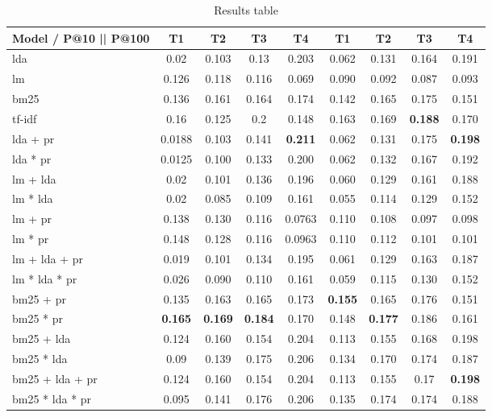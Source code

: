 \begin{table*}[h]
	\centering
	\caption{Results table}
	\begin{tabular}{l|c|c|c|c||c|c|c|c}
		Model / P@10 || P@100 & T1 & T2 & T3 & T4 & T1 & T2 & T3 & T4\\
		\midrule
		\gls{lda} & 0.02 & 0.103 & 0.13 & 0.203 & 0.062 & 0.131 & 0.164 & 0.191 \\
		\gls{lm} & 0.126 & 0.118 & 0.116 & 0.069 & 0.090 & 0.092 & 0.087 & 0.093\\
		\gls{bm25} & 0.136 & 0.161 & 0.164 & 0.174 & 0.142 & 0.165 & 0.175 & 0.151\\ 
		\gls{tf-idf} & 0.16 & 0.125 & 0.2 & 0.148 & 0.163 & 0.169 & \textbf{0.188} & 0.170 \\
		\gls{lda} + \gls{pr} & 0.0188 & 0.103 & 0.141 & \textbf{0.211} & 0.062 & 0.131 & 0.175 & \textbf{0.198} \\
		\gls{lda} * \gls{pr} & 0.0125 & 0.100 & 0.133 & 0.200 & 0.062 & 0.132 & 0.167 & 0.192 \\
		\gls{lm} + \gls{lda} & 0.02 & 0.101 & 0.136 & 0.196 & 0.060 & 0.129 & 0.161 & 0.188  \\
		\gls{lm} * \gls{lda} & 0.02 & 0.085 & 0.109 & 0.161 & 0.055 & 0.114 & 0.129 & 0.152 \\
		\gls{lm} + \gls{pr} & 0.138 & 0.130 & 0.116 & 0.0763 & 0.110 & 0.108 & 0.097 & 0.098 \\
		\gls{lm} * \gls{pr} & 0.148 & 0.128 & 0.116 & 0.0963 & 0.110 & 0.112 & 0.101 & 0.101 \\
		\gls{lm} + \gls{lda} + \gls{pr} & 0.019 & 0.101 & 0.134 & 0.195 & 0.061 & 0.129 & 0.163 & 0.187\\
		\gls{lm} * \gls{lda} * \gls{pr} & 0.026 & 0.090 & 0.110 & 0.161 & 0.059 & 0.115 & 0.130 & 0.152\\
		\gls{bm25} + \gls{pr} & 0.135 & 0.163 & 0.165 & 0.173 & \textbf{0.155} & 0.165 & 0.176 & 0.151 \\
		\gls{bm25} * \gls{pr} & \textbf{0.165} & \textbf{0.169} & \textbf{0.184} & 0.170 & 0.148 & \textbf{0.177} & 0.186 & 0.161\\
		\gls{bm25} + \gls{lda} & 0.124 & 0.160 & 0.154 & 0.204 & 0.113 & 0.155 & 0.168 & 0.198 \\
		\gls{bm25} * \gls{lda} & 0.09 & 0.139 & 0.175& 0.206 & 0.134 & 0.170 & 0.174 & 0.187 \\
		\gls{bm25} + \gls{lda} + \gls{pr} & 0.124 & 0.160 & 0.154 & 0.204 & 0.113 & 0.155 & 0.17 & \textbf{0.198}\\
		\gls{bm25} * \gls{lda} * \gls{pr} & 0.095 & 0.141 & 0.176 & 0.206 & 0.135 & 0.174 & 0.174 & 0.188\\
	\end{tabular}
	
	\label{tab:results_precision_at_10}
\end{table*}


